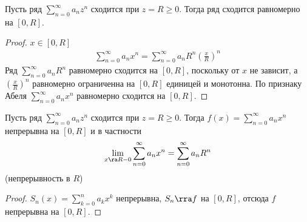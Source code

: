 \begin{theorem}[Абеля]
	Пусть ряд $\sum_{n=0}^\infty a_n z^n$ сходится при $z = R \ge 0$.
	Тогда ряд сходится равномерно на $[0, R]$.
\end{theorem}
\begin{proof}
	$x \in [0, R]$
	\begin{gather*}
		\sum_{n=0}^\infty a_n x^n
		= \sum_{n=0}^\infty a_n R^n \left(\frac xR\right)^n
	\end{gather*}
	Ряд $\sum_{n=0}^\infty a_n R^n$ равномерно сходится на $[0, R]$, поскольку от $x$ не зависит,
	а $\left(\frac xR\right)^n$ равномерно ограниченна на $[0, R]$ единицей и монотонна.
	По признаку Абеля $\sum_{n=0}^\infty a_n x^n$ равномерно сходится на $[0, R]$.
\end{proof}

\begin{conseq}
	Пусть ряд $\sum_{n=0}^\infty a_n z^n$ сходится при $z = R \ge 0$.
	Тогда $f(x) = \sum_{n=0}^\infty a_n x^n$ непрерывна на $[0, R]$
	и в частности
	\[ \lim_{x \ra R-0} \sum_{n=0}^\infty a_n x^n = \sum_{n=0}^\infty a_n R^n \]
	(непрерывность в $R$)
\end{conseq}
\begin{proof}
	$S_n(x) = \sum_{k=0}^n a_k x^k$ непрерывна, $S_n \rra f$ на $[0, R]$, отсюда $f$ непрерывна на $[0, R]$.
\end{proof}

